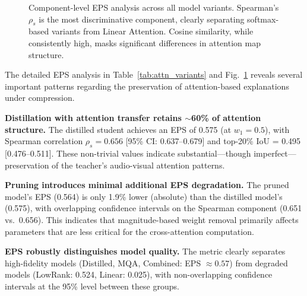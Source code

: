 \documentclass[lettersize,journal]{IEEEtran}
\begin{document}
\begin{figure}[!t]
\centering
{}
\caption{Component-level EPS analysis across all model variants. Spearman's $\rho_s$ is the most discriminative component, clearly separating softmax-based variants from Linear Attention. Cosine similarity, while consistently high, masks significant differences in attention map structure.}
\label{fig:eps_bars}
\end{figure}

The detailed EPS analysis in Table~\ref{tab:attn_variants} and Fig.~\ref{fig:eps_bars} reveals several important patterns regarding the preservation of attention-based explanations under compression.

\textbf{Distillation with attention transfer retains $\sim$60\% of attention structure.} The distilled student achieves an EPS of 0.575 (at $w_1 = 0.5$), with Spearman correlation $\rho_s = 0.656$ [95\% CI: 0.637--0.679] and top-20\% IoU = 0.495 [0.476--0.511]. These non-trivial values indicate substantial---though imperfect---preservation of the teacher's audio-visual attention patterns.

\textbf{Pruning introduces minimal additional EPS degradation.} The pruned model's EPS (0.564) is only 1.9\% lower (absolute) than the distilled model's (0.575), with overlapping confidence intervals on the Spearman component (0.651 vs.\ 0.656). This indicates that magnitude-based weight removal primarily affects parameters that are less critical for the cross-attention computation.

\textbf{EPS robustly distinguishes model quality.} The metric clearly separates high-fidelity models (Distilled, MQA, Combined: EPS $\approx 0.57$) from degraded models (LowRank: 0.524, Linear: 0.025), with non-overlapping confidence intervals at the 95\% level between these groups.
\end{document}
